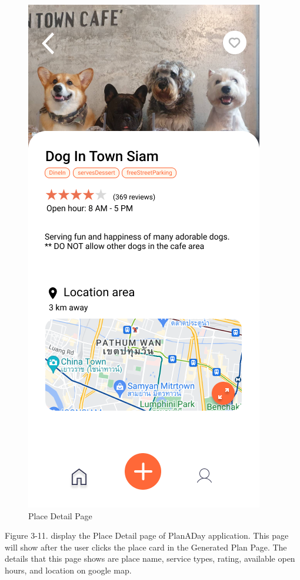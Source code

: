 \newpage
\begin{figure}[!h]
    \centering
    \includegraphics[width=0.5\linewidth]{chapter3/UI_Place_detail.png}
    \caption{Place Detail Page}
    \label{fig:Place Detail Page}
\end{figure}
\noindent
Figure 3-11. display the Place Detail page of PlanADay application. This page will
show after the user clicks the place card in the Generated Plan Page. The details
that this page shows are place name, service types, rating, available open hours, and
location on google map.

